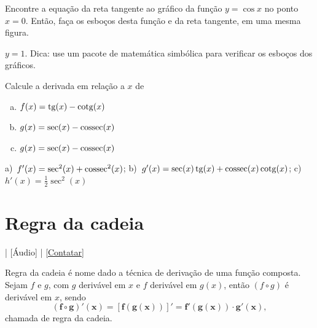 \begin{exer}
  Encontre a equação da reta tangente ao gráfico da função $y = \cos x$ no ponto $x=0$. Então, faça os esboços desta função e da reta tangente, em uma mesma figura.  
\end{exer}
\begin{resp}
  $y = 1$. Dica: use um pacote de matemática simbólica para verificar os esboços dos gráficos.
\end{resp}

\begin{exer}
  Calcule a derivada em relação a $x$ de
  \begin{enumerate}[a)]
  \item $\displaystyle f(x)=\operatorname{tg}(x)-\operatorname{cotg}(x)$
  \item $\displaystyle g(x)=\sec(x)-\operatorname{cossec}(x)$
  \item $\displaystyle g(x)=\sec(x)-\operatorname{cossec}(x)$
  \end{enumerate}
\end{exer}
\begin{resp}
  a)~$f'(x)=\sec^2(x)+\operatorname{cossec}^2(x)$; b)~$g'(x)=\sec(x)\operatorname{tg}(x)+\operatorname{cossec}(x)\operatorname{cotg}(x)$; c)~$h'(x)=\frac{1}{2}\sec^2(x)$
\end{resp}


\section{Regra da cadeia}\label{cap_deriv_sec_cadeia}

\begin{flushright}
  [Vídeo] | [Áudio] | \href{https://phkonzen.github.io/notas/contato.html}{[Contatar]}
\end{flushright}

Regra da cadeia é nome dado a técnica de derivação de uma função composta. Sejam $f$ e $g$, com $g$ derivável em $x$ e $f$ derivável em $g(x)$, então $(f\circ g)$ é derivável em $x$, sendo
\begin{equation}
  \pmb{(f\circ g)'(x) = [f(g(x))]' = f'(g(x))\cdot g'(x)},
\end{equation}
chamada de regra da cadeia.

